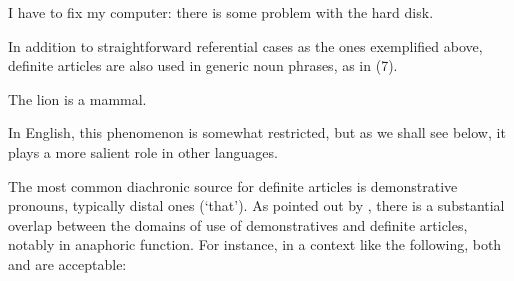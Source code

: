 
\item 

\label{bkm:Ref75942712}I have to fix my computer: there is some problem with the hard disk. 



In addition to straightforward referential cases as the ones exemplified above, definite articles are also used in generic noun phrases, as in (7). 


\item 

\label{bkm:Ref123549675}The lion is a mammal.



In English, this phenomenon is somewhat restricted, but as we shall see below, it plays a more salient role in other languages.


The most common diachronic source for definite articles is demonstrative pronouns, typically distal ones (‘that’). As pointed out by \citet[332]{Lyons1999}, there is a substantial overlap between the domains of use of demonstratives and definite articles, notably in anaphoric function. For instance, in a context like the following, both  and  are acceptable:


\item 

